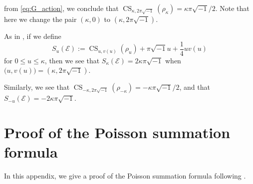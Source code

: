 \documentclass[a4paper,dvipdfmx]{amsart}
\theoremstyle{plain}
\theoremstyle{definition}
\theoremstyle{remark}
\newcommand{\CS}{\operatorname{CS}}
\newcommand{\FE}{\mathscr{E}}
\renewcommand{\i}{\sqrt{-1}}
\numberwithin{equation}{section}
\begin{document}
from \eqref{eq:G_action}, we conclude that $\CS_{\kappa,2\pi\i}(\rho_{\kappa})=\kappa\pi\i/2$.
Note that here we change the pair $(\kappa,0)$ to $(\kappa,2\pi\i)$.
\par
As in \cite{Murakami:JTOP2013}, if we define
\begin{equation}\label{eq:S_fig8}
  S_{u}(\FE)
  :=
  \CS_{u,v(u)}(\rho_{u})
  +\pi\i u+\frac{1}{4}uv(u)
\end{equation}
for $0\le u\le\kappa$, then we see that $S_{\kappa}(\FE)=2\kappa\pi\i$ when $\bigl(u,v(u)\bigr)=(\kappa,2\pi\i)$.
\par
Similarly, we see that $\CS_{-\kappa,2\pi\i}(\rho_{-\kappa})=-\kappa\pi\i/2$, and that $S_{-u}(\FE)=-2\kappa\pi\i$.

\appendix
\section{Proof of the Poisson summation formula}\label{sec:Poisson_proof}
In this appendix, we give a proof of the Poisson summation formula following \cite[Proposition~4.2]{Ohtsuki:QT2016}.
\end{document}
